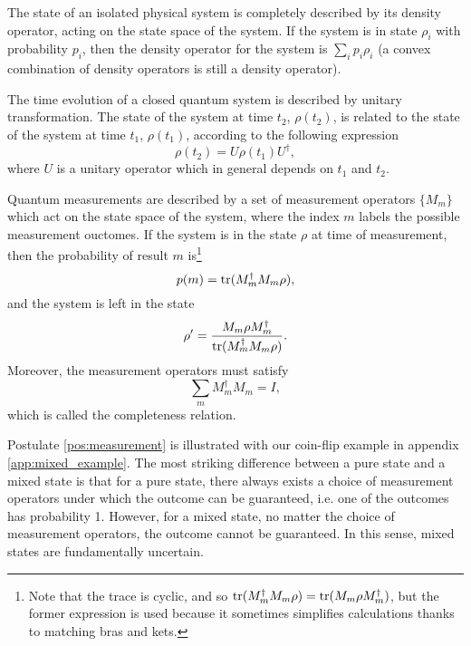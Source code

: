 \begin{postulate} \label{pos:state} %
    The state of an isolated physical system is completely described by its density operator, acting on the state space of the system. If the system is in state $\rho_i$ with probability $p_i$, then the density operator for the system is $\sum_i p_i \rho_i$ (a convex combination of density operators is still a density operator).
\end{postulate}

\begin{postulate} \label{pos:evolution}
    The time evolution of a closed quantum system is described by unitary transformation. The state of the system at time $t_2$, $\rho(t_2)$, is related to the state of the system at time $t_1$, $\rho(t_1)$, according to the following expression
    \begin{equation}
        \rho(t_2) = U \rho(t_1) U^\dagger,
    \end{equation}
    where $U$ is a unitary operator which in general depends on $t_1$ and $t_2$.
\end{postulate}

\begin{postulate} \label{pos:measurement}
    Quantum measurements are described by a set of measurement operators $\{M_m\}$ which act on the state space of the system, where the index $m$ labels the possible measurement ouctomes. If the system is in the state $\rho$ at time of measurement, then the probability of result $m$ is\footnote{Note that the trace is cyclic, and so $\operatorname{tr}(M_m^\dagger M_m \rho) = \operatorname{tr}(M_m \rho M_m^\dagger)$, but the former expression is used because it sometimes simplifies calculations thanks to matching bras and kets.} 
    \begin{equation}
        p(m) = \operatorname{tr}(M_m^\dagger M_m \rho),
    \end{equation}
    and the system is left in the state
    \begin{equation}
        \rho' = \frac{M_m \rho M_m^\dagger}{\operatorname{tr}(M_m^\dagger M_m \rho)}.
    \end{equation}
    Moreover, the measurement operators must satisfy
    \begin{equation}
        \sum_m M_m^\dagger M_m = I,
    \end{equation}
    which is called the completeness relation.
\end{postulate}

Postulate \ref{pos:measurement} is illustrated with our coin-flip example in appendix \ref{app:mixed_example}. The most striking difference between a pure state and a mixed state is that for a pure state, there always exists a choice of measurement operators under which the outcome can be guaranteed, i.e. one of the outcomes has probability 1. However, for a mixed state, no matter the choice of measurement operators, the outcome cannot be guaranteed. In this sense, mixed states are fundamentally uncertain.



